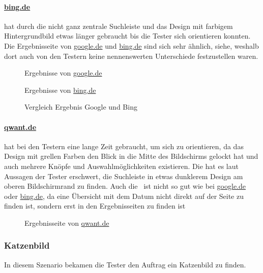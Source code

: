 \paragraph{\url{bing.de}} hat durch die nicht ganz zentrale Suchleiste und das Design mit farbigem Hintergrundbild etwas länger gebraucht bis die Tester sich orientieren konnten.
Die Ergebnisseite von \url{google.de} und \url{bing.de} sind sich sehr ähnlich, siehe, weshalb dort auch von den Testern keine nennenswerten Unterschiede festzustellen waren.\\
\begin{figure}
    \centering
    \begin{minipage}[t]{0.45\linewidth}
        \centering
        Ergebnisse von \url{google.de}
    \end{minipage}%
    \hfill\vrule\hfill
    \begin{minipage}[t]{0.45\linewidth}
        \centering
        Ergebnisse von \url{bing.de}
    \end{minipage}
    \caption{Vergleich Ergebnis Google und Bing}\label{fig:tag_des_internets_results}
\end{figure}

\paragraph{\url{qwant.de}} hat bei den Testern eine lange Zeit gebraucht, um sich zu orientieren,
da das Design mit grellen Farben den Blick in die Mitte des Bildschirms gelockt hat und auch mehrere Knöpfe und Auswahlmöglichkeiten existieren.
Die hat es laut Aussagen der Tester erschwert, die Suchleiste in etwas dunklerem Design am oberen Bildschirmrand zu finden.
Auch die~ ist nicht so gut wie bei \url{google.de} oder \url{bing.de},
da eine Übersicht mit dem Datum nicht direkt auf der Seite zu finden ist,
sondern erst in den Ergebnisseiten zu finden ist
\begin{figure}
    \centering
    \caption{Ergebnisseite von \url{qwant.de}}\label{fig:qwant_tag_des_internets_results}
\end{figure}

\subsubsection{Katzenbild}\label{subsubsec:szenario2}
In diesem Szenario bekamen die Tester den Auftrag ein Katzenbild zu finden.

